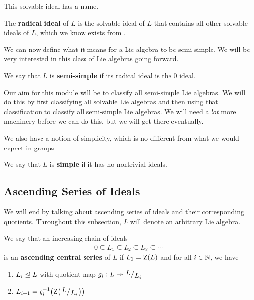 This solvable ideal has a name.

\begin{boxdefinition}
    The \textbf{radical ideal} of $L$ is the solvable ideal of $L$ that contains all other solvable ideals of $L$, which we know exists from .
\end{boxdefinition}

We can now define what it means for a Lie algebra to be semi-simple. We will be very interested in this class of Lie algebras going forward.

\begin{boxdefinition}\label{Ch1:Def:SemiSimple}
    We say that $L$ is \textbf{semi-simple} if its radical ideal is the $0$ ideal.
\end{boxdefinition}

Our aim for this module will be to classify all semi-simple Lie algebras. We will do this by first classifying all solvable Lie algebras and then using that classification to classify all semi-simple Lie algebras. We will need a \textit{lot} more machinery before we can do this, but we will get there eventually.

We also have a notion of simplicity, which is no different from what we would expect in groups.

\begin{boxdefinition}[Simplicity]
    We say that $L$ is \textbf{simple} if it has no nontrivial ideals.
\end{boxdefinition}

\subsection{Ascending Series of Ideals}

We will end by talking about ascending series of ideals and their corresponding quotients. Throughout this subsection, $L$ will denote an arbitrary Lie algebra.

\begin{boxdefinition}
    We say that an increasing chain of ideals
    \begin{align*}
        0 \subseteq L_1 \subseteq L_2 \subseteq L_3 \subseteq \cdots
    \end{align*}
    is an \textbf{ascending central series} of $L$ if $L_1 = \operatorname{Z}\!\left( L \right)$ and for all $i \in \mathbb{N}$, we have
    \begin{enumerate}
        \item $L_i \trianglelefteq L$ with quotient map $g_i : L \surj \quotient{L}{L_i}$
        \item $L_{i + 1} = g_i\inv\!\parenth{\Zof{\quotient{L}{L_i}}}$
    \end{enumerate}
\end{boxdefinition}

